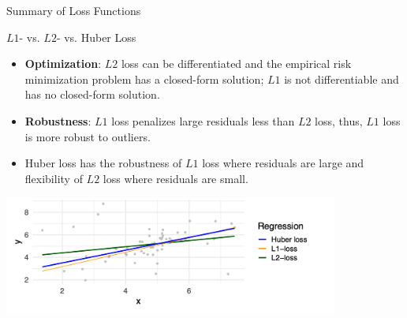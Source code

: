 \begin{vbframe}{Summary of Loss Functions}


\end{vbframe}

\begin{vbframe}{$L1$- vs. $L2$- vs. Huber Loss}
\begin{itemize}
\item \textbf{Optimization}: $L2$ loss can be differentiated and the empirical risk minimization problem has a closed-form solution; $L1$ is not differentiable and has no closed-form solution.
\item \textbf{Robustness}: $L1$ loss penalizes large residuals less than $L2$ loss, thus, $L1$ loss is more robust to outliers.
\item Huber loss has the robustness of $L1$ loss where residuals are large and flexibility of $L2$ loss where residuals are small.
\end{itemize}

\vspace*{0.1cm}
\begin{center}
\includegraphics[width = 11cm ]{figure_man/different_losses.png}
\end{center}

\end{vbframe}



\endlecture

